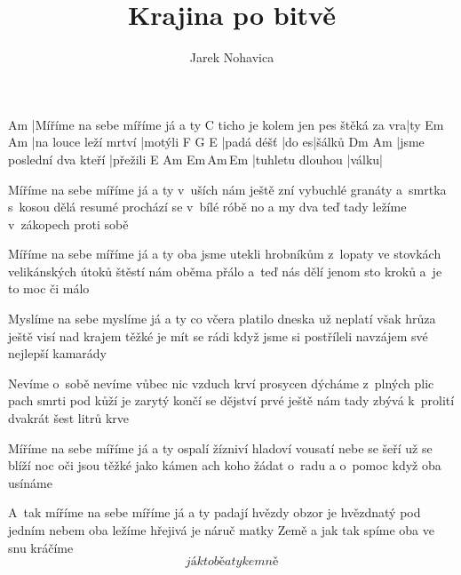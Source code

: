 \documentclass{song}
\author{Jarek Nohavica}
\title{Krajina po bitvě}
\begin{document}
\strophe
Am
|Míříme na sebe míříme já a ty
                                   C
ticho je kolem jen pes štěká za vra|ty
Em                   Am
|na louce leží mrtví |motýli
F          G     E\7
|padá déšť |do es|šálků
Dm                       Am
|jsme poslední dva kteří |přežili
E\7              Am    Em\7\,Am\,Em
|tuhletu dlouhou |válku|
\endstrophe

\begin{multicols}{2}
\strophe*
Míříme na sebe míříme já a ty
v~uších nám ještě zní vybuchlé granáty
a~smrtka s~kosou dělá resumé
prochází se v~bílé róbě
no a my dva teď tady ležíme
v~zákopech proti sobě
\endstrophe

\strophe*
Míříme na sebe míříme já a ty
oba jsme utekli hrobníkům z~lopaty
ve stovkách velikánských útoků
štěstí nám oběma přálo
a~teď nás dělí jenom sto kroků
a~je to moc či málo
\endstrophe

\strophe*
Myslíme na sebe myslíme já a ty
co včera platilo dneska už neplatí
však hrůza ještě visí nad krajem
těžké je mít se rádi
když jsme si postříleli navzájem
své nejlepší kamarády
\endstrophe

\strophe*
Nevíme o~sobě nevíme vůbec nic
vzduch krví prosycen dýcháme z~plných plic
pach smrti pod kůží je zarytý
končí se dějství prvé
ještě nám tady zbývá k~prolití
dvakrát šest litrů krve
\endstrophe

\strophe*
Míříme na sebe míříme já a ty
ospalí žízniví hladoví vousatí
nebe se šeří už se blíží noc
oči jsou těžké jako kámen
ach koho žádat o~radu a o~pomoc
když oba usínáme
\endstrophe

\strophe*
A~tak míříme na sebe míříme já a ty
padají hvězdy obzor je hvězdnatý
pod jedním nebem oba ležíme
hřejivá je náruč matky Země
a jak tak spíme oba ve snu kráčíme
\[ já k tobě a ty ke mně \]
\endstrophe
\end{multicols}
\end{document}
